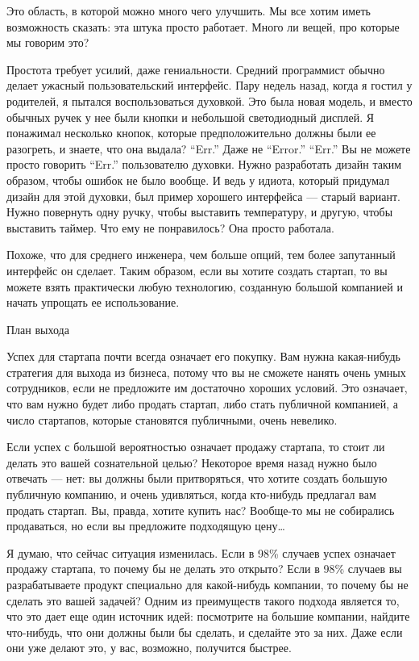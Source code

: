 \documentclass[ebook,12pt,oneside,openany]{memoir}
\begin{document}
Это область, в которой можно много чего улучшить. Мы все хотим иметь
возможность сказать: эта штука просто работает. Много ли вещей, про
которые мы говорим это?

Простота требует усилий, даже гениальности. Средний программист обычно
делает ужасный пользовательский интерфейс. Пару недель назад, когда я
гостил у родителей, я пытался воспользоваться духовкой. Это была новая
модель, и вместо обычных ручек у нее были кнопки и небольшой
светодиодный дисплей. Я понажимал несколько кнопок, которые
предположительно должны были ее разогреть, и знаете, что она выдала?
“Err.” Даже не “Error.” “Err.” Вы не можете просто говорить “Err.”
пользователю духовки. Нужно разработать дизайн таким образом, чтобы
ошибок не было вообще. И ведь у идиота, который придумал дизайн для
этой духовки, был пример хорошего интерфейса — старый вариант. Нужно
повернуть одну ручку, чтобы выставить температуру, и другую, чтобы
выставить таймер. Что ему не понравилось? Она просто работала.

Похоже, что для среднего инженера, чем больше опций, тем более
запутанный интерфейс он сделает. Таким образом, если вы хотите создать
стартап, то вы можете взять практически любую технологию, созданную
большой компанией и начать упрощать ее использование.

План выхода

Успех для стартапа почти всегда означает его покупку. Вам нужна
какая-нибудь стратегия для выхода из бизнеса, потому что вы не сможете
нанять очень умных сотрудников, если не предложите им достаточно
хороших условий. Это означает, что вам нужно будет либо продать
стартап, либо стать публичной компанией, а число стартапов, которые
становятся публичными, очень невелико.

Если успех с большой вероятностью означает продажу стартапа, то стоит
ли делать это вашей сознательной целью? Некоторое время назад нужно
было отвечать — нет: вы должны были притворяться, что хотите создать
большую публичную компанию, и очень удивляться, когда кто-нибудь
предлагал вам продать стартап. Вы, правда, хотите купить нас?
Вообще-то мы не собирались продаваться, но если вы предложите
подходящую цену…

Я думаю, что сейчас ситуация изменилась. Если в 98\% случаев успех
означает продажу стартапа, то почему бы не делать это открыто? Если в
98\% случаев вы разрабатываете продукт специально для какой-нибудь
компании, то почему бы не сделать это вашей задачей? Одним из
преимуществ такого подхода является то, что это дает еще один источник
идей: посмотрите на большие компании, найдите что-нибудь, что они
должны были бы сделать, и сделайте это за них. Даже если они уже
делают это, у вас, возможно, получится быстрее.
\end{document}

